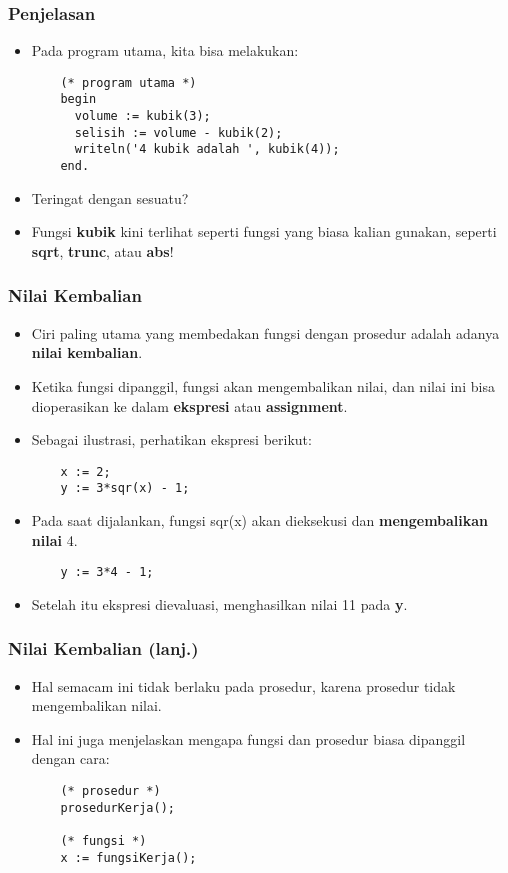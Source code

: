 \begin{frame}[fragile]
\frametitle{Penjelasan}
\begin{itemize}
  \item Pada program utama, kita bisa melakukan:
  \begin{lstlisting}
    (* program utama *)
    begin
      volume := kubik(3);
      selisih := volume - kubik(2);
      writeln('4 kubik adalah ', kubik(4));
    end.
  \end{lstlisting}
  \item Teringat dengan sesuatu?
  \item Fungsi \textbf{kubik} kini terlihat seperti fungsi yang biasa kalian gunakan, seperti \textbf{sqrt}, \textbf{trunc}, atau \textbf{abs}!
\end{itemize}
\end{frame}

\begin{frame}[fragile]
\frametitle{Nilai Kembalian}
\begin{itemize}
  \item Ciri paling utama yang membedakan fungsi dengan prosedur adalah adanya \textbf{nilai kembalian}.
  \item Ketika fungsi dipanggil, fungsi akan mengembalikan nilai, dan nilai ini bisa dioperasikan ke dalam \textbf{ekspresi} atau \textbf{assignment}.
  \item Sebagai ilustrasi, perhatikan ekspresi berikut:
  \begin{lstlisting}
    x := 2;
    y := 3*sqr(x) - 1;
  \end{lstlisting}
  \item Pada saat dijalankan, fungsi sqr(x) akan dieksekusi dan \textbf{mengembalikan nilai} 4.
  \begin{lstlisting}
    y := 3*4 - 1;
  \end{lstlisting}
  \item Setelah itu ekspresi dievaluasi, menghasilkan nilai 11 pada \textbf{y}.
\end{itemize}
\end{frame}

\begin{frame}[fragile]
\frametitle{Nilai Kembalian (lanj.)}
\begin{itemize}
  \item Hal semacam ini tidak berlaku pada prosedur, karena prosedur tidak mengembalikan nilai.
  \item Hal ini juga menjelaskan mengapa fungsi dan prosedur biasa dipanggil dengan cara:
  \begin{lstlisting}
    (* prosedur *)
    prosedurKerja();

    (* fungsi *)
    x := fungsiKerja();
  \end{lstlisting}
\end{itemize}
\end{frame}

